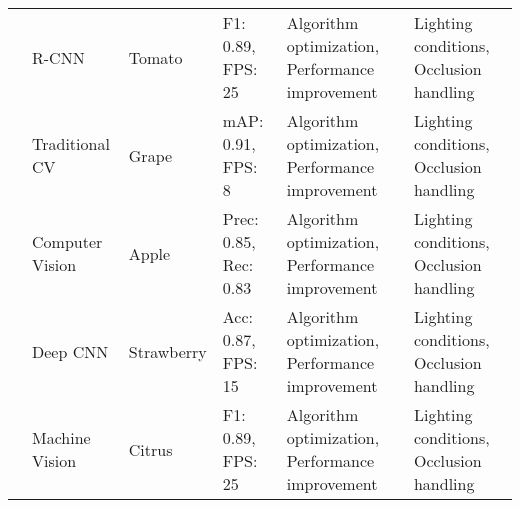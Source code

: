 \begin{table*}[htbp]
\begin{tabular}{@{}p{}p{}p{}p{}p{}p{}@{}}
\cite{r2018research} & R-CNN & Tomato & F1: 0.89, FPS: 25 & Algorithm optimization, Performance improvement & Lighting conditions, Occlusion handling \\
\cite{mohamed2021smart} & Traditional CV & Grape & mAP: 0.91, FPS: 8 & Algorithm optimization, Performance improvement & Lighting conditions, Occlusion handling \\
\cite{sharma2020machine} & Computer Vision & Apple & Prec: 0.85, Rec: 0.83 & Algorithm optimization, Performance improvement & Lighting conditions, Occlusion handling \\
\cite{zhang2020technology} & Deep CNN & Strawberry & Acc: 0.87, FPS: 15 & Algorithm optimization, Performance improvement & Lighting conditions, Occlusion handling \\
\cite{zhao2013design} & Machine Vision & Citrus & F1: 0.89, FPS: 25 & Algorithm optimization, Performance improvement & Lighting conditions, Occlusion handling \\
\bottomrule
\end{tabular}
\end{table*}